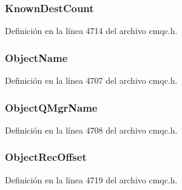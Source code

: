 \subsubsection[{Known\+Dest\+Count}]{ Known\+Dest\+Count}\label{structtag_m_q_o_d_ab63679527a2a808aa8c189eeca5d0712}


Definición en la línea 4714 del archivo cmqc.\+h.

\hypertarget{structtag_m_q_o_d_a2106fb125a9f7fc606340ba23c006bc0}{}
\subsubsection[{Object\+Name}]{ Object\+Name}\label{structtag_m_q_o_d_a2106fb125a9f7fc606340ba23c006bc0}


Definición en la línea 4707 del archivo cmqc.\+h.

\hypertarget{structtag_m_q_o_d_ac72719d0cdc669269aa503462d5c7536}{}
\subsubsection[{Object\+Q\+Mgr\+Name}]{ Object\+Q\+Mgr\+Name}\label{structtag_m_q_o_d_ac72719d0cdc669269aa503462d5c7536}


Definición en la línea 4708 del archivo cmqc.\+h.

\hypertarget{structtag_m_q_o_d_a8ec0fdf14ab5b4d0f7caf7f333dfbeb4}{}
\subsubsection[{Object\+Rec\+Offset}]{ Object\+Rec\+Offset}\label{structtag_m_q_o_d_a8ec0fdf14ab5b4d0f7caf7f333dfbeb4}


Definición en la línea 4719 del archivo cmqc.\+h.

\hypertarget{structtag_m_q_o_d_aa46059ff8062713d03173a8847594a25}{}
